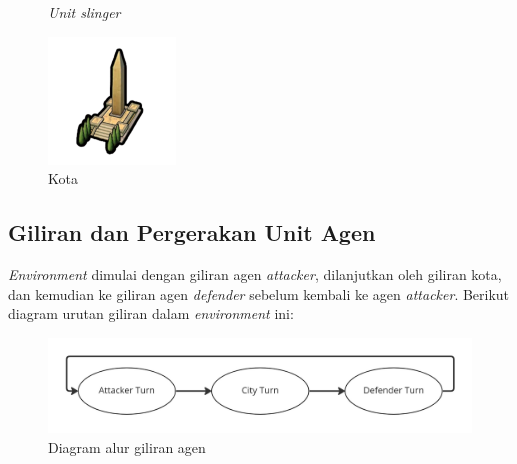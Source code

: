 \begin{figure}[!htb]
\begin{minipage}{0.32\textwidth}
    \caption{\emph{Unit slinger}}\label{Fig:slinger}
  \end{minipage}
  \begin{minipage}{0.32\textwidth}
    \centering
    \includegraphics[width=\linewidth]{gambar/city.png}
    \caption{Kota}\label{Fig:kota}
  \end{minipage}
\end{figure}

\subsection{Giliran dan Pergerakan Unit Agen}
\emph{Environment} dimulai dengan giliran agen \emph{attacker}, dilanjutkan oleh giliran kota, dan kemudian
ke giliran agen \emph{defender} sebelum kembali ke agen \emph{attacker}.
Berikut diagram urutan giliran dalam \emph{environment} ini:

\begin{figure}[H]
  \centering
    \includegraphics[scale=0.2]{gambar/turn_diagram.jpg}
    \caption{Diagram alur giliran agen}
    \label{fig:turnSequenceDiagram}
\end{figure}

